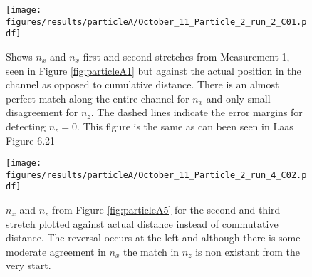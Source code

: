 \begin{figure}[H]
\begin{center}
\texttt{[image: figures/results/particleA/October\_11\_Particle\_2\_run\_2\_C01.pdf]}
\end{center}
\caption{Shows $n_x$ and $n_x$ first and second stretches from Measurement 1, seen in Figure \ref{fig:particleA1} but against the actual position in the channel as opposed to cumulative distance. There is an almost perfect match along the entire channel for $n_x$ and only small disagreement for $n_z$. The dashed lines indicate the error margins for detecting $n_z=0$. This figure is the same as can been seen in Laas\cite{alexanderThesis} Figure 6.21}
\label{fig:particleAreversegood}
\end{figure}

 \begin{figure}[H]
 \centering
 \texttt{[image: figures/results/particleA/October\_11\_Particle\_2\_run\_4\_C02.pdf]}
 \caption{$n_x$ and $n_z$ from Figure \ref{fig:particleA5} for the second and third stretch plotted against actual distance instead of commutative distance. The reversal occurs at the left and although there is some moderate agreement in $n_x$ the match in $n_z$ is non existant from the very start.}
 \label{fig:particleABadReversal}
 \end{figure}
